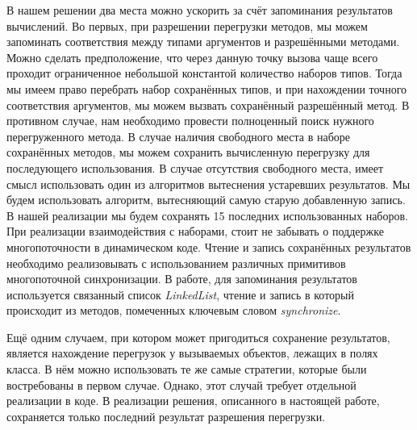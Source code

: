 В нашем решении два места можно ускорить за счёт запоминания результатов вычислений. Во первых, при разрешении перегрузки методов, мы можем запоминать соответствия между типами аргументов и разрешёнными методами. Можно сделать предположение, что через данную точку вызова чаще всего проходит ограниченное небольшой константой количество наборов типов. Тогда мы имеем право перебрать набор сохранённых типов, и при нахождении точного соответствия аргументов, мы можем вызвать сохранённый  разрешённый метод. В противном случае, нам необходимо провести полноценный поиск нужного перегруженного метода. В случае наличия свободного места в наборе сохранённых методов, мы можем сохранить вычисленную перегрузку для последующего использования. В случае отсутствия свободного места, имеет смысл использовать один из алгоритмов вытеснения устаревших результатов. Мы будем использовать алгоритм, вытесняющий самую старую добавленную запись. В нашей реализации мы будем сохранять 15 последних использованных наборов. При реализации взаимодействия с наборами, стоит не забывать о поддержке многопоточности в динамическом коде. Чтение и запись сохранённых результатов необходимо реализовывать с использованием различных примитивов многопоточной синхронизации. В работе, для запоминания результатов используется связанный список \textit{LinkedList}, чтение и запись в который происходит из методов, помеченных ключевым словом \textit{synchronize}.

Ещё одним случаем, при котором может пригодиться сохранение результатов, является нахождение перегрузок у вызываемых объектов, лежащих в полях класса. В нём можно использовать те же самые стратегии, которые были востребованы в первом случае. Однако, этот случай требует отдельной реализации в коде. В реализации решения, описанного в настоящей работе, сохраняется только последний результат разрешения перегрузки.